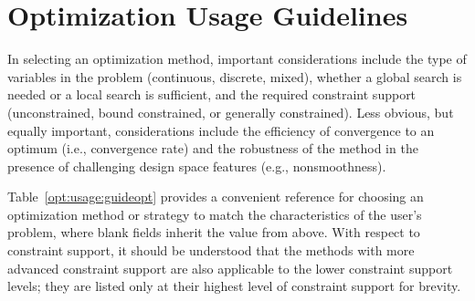 %

\section{Optimization Usage Guidelines}
\label{opt:usage}

In selecting an optimization method, important considerations include
the type of variables in the problem (continuous, discrete, mixed),
whether a global search is needed or a local search is sufficient, and
the required constraint support (unconstrained, bound constrained, or
generally constrained). Less obvious, but equally important,
considerations include the efficiency of convergence to an optimum
(i.e., convergence rate) and the robustness of the method in the
presence of challenging design space features (e.g., nonsmoothness).

Table~\ref{opt:usage:guideopt} provides a convenient reference for
choosing an optimization method or strategy to match the
characteristics of the user's problem, where blank fields inherit the
value from above. With respect to constraint support, it should be
understood that the methods with more advanced constraint support are
also applicable to the lower constraint support levels; they are
listed only at their highest level of constraint support for brevity.

